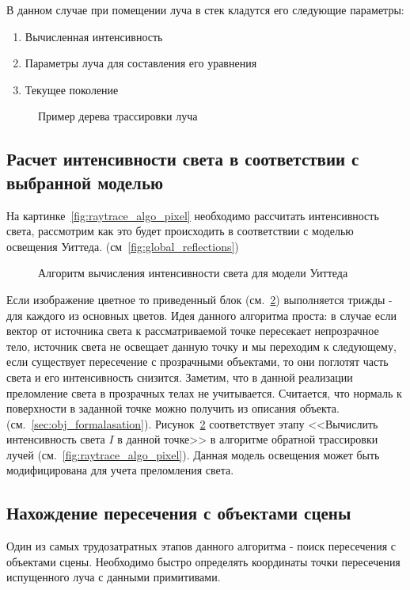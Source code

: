 В данном случае при помещении луча в стек кладутся его следующие параметры:
\begin{enumerate}
	\item Вычисленная интенсивность 
	\item Параметры луча для составления его уравнения 
	\item Текущее поколение \cite{Rodgers}
\end{enumerate}



\begin{figure}[h]
	\centering
	
	\caption{Пример дерева трассировки луча}
	\label{fig:raytrace_tree}
\end{figure}

\subsection{Расчет интенсивности света в соответствии с выбранной моделью}
На картинке~\ref{fig:raytrace_algo_pixel} необходимо рассчитать интенсивность света, рассмотрим как это будет происходить в соответствии с моделью освещения Уиттеда. (см~\ref{fig:global_reflections})
\begin{figure}[H]
	\centering
	
	\caption{Алгоритм вычисления интенсивности света для модели Уиттеда}
	\label{fig:yuitted_model_algo}
\end{figure}
Если изображение цветное то приведенный блок (см.~\ref{fig:yuitted_model_algo}) выполняется трижды - для каждого из основных цветов. Идея данного алгоритма проста:
в случае если вектор от источника света к рассматриваемой точке пересекает непрозрачное тело, источник света не освещает данную точку и мы переходим к следующему,
если существует пересечение с прозрачными объектами, то они поглотят часть света и его интенсивность снизится. Заметим, что в данной реализации преломление света в прозрачных телах не учитывается.
Считается, что нормаль к поверхности в заданной точке можно получить из описания объекта. (см.~\ref{sec:obj_formalasation}).
Рисунок~\ref{fig:yuitted_model_algo} соответствует этапу <<Вычислить интенсивность света \(I\) в данной точке>> в алгоритме обратной трассировки лучей (см.~\ref{fig:raytrace_algo_pixel}).
Данная модель освещения может быть модифицирована для учета преломления света. \cite{Rodgers}

\subsection{Нахождение пересечения с объектами сцены}
Один из самых трудозатратных этапов данного алгоритма  - поиск пересечения с объектами сцены. Необходимо быстро определять координаты точки пересечения испущенного луча 
с данными примитивами.


